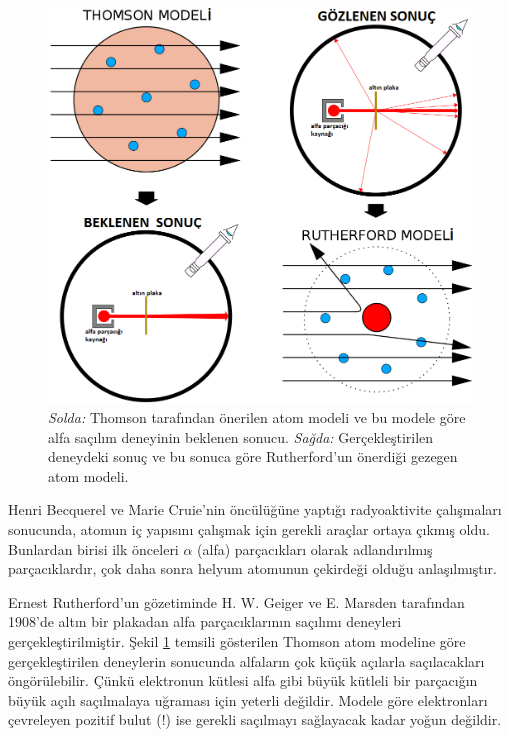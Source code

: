 \documentclass[a4paper,12pt, twoside]{article}
\begin{document}
\begin{figure}[hbtp]
\center
\includegraphics[scale=.5]{Thomson_vs_Rutherford_Atom.png}
\caption{ {\it Solda:} Thomson tarafından önerilen atom modeli ve bu modele göre alfa saçılım deneyinin beklenen sonucu. {\it Sağda:} Gerçekleştirilen deneydeki sonuç ve bu sonuca göre Rutherford'un önerdiği gezegen atom modeli. }
\label{fig:rutherfod_bohr_atom}
\end{figure}

Henri Becquerel ve Marie Cruie'nin öncülüğüne yaptığı radyoaktivite çalışmaları sonucunda, atomun iç yapısını çalışmak için gerekli araçlar ortaya çıkmış oldu. Bunlardan birisi ilk önceleri $\alpha$ (alfa) parçacıkları olarak adlandırılmış parçacıklardır, çok daha sonra helyum atomunun çekirdeği olduğu anlaşılmıştır. 

Ernest Rutherford'un gözetiminde H. W. Geiger  ve E. Marsden tarafından 1908'de altın bir plakadan alfa parçacıklarının saçılımı deneyleri gerçekleştirilmiştir. Şekil \ref{fig:rutherfod_bohr_atom} temsili gösterilen Thomson atom modeline göre gerçekleştirilen deneylerin sonucunda alfaların çok küçük açılarla saçılacakları öngörülebilir. Çünkü elektronun kütlesi alfa gibi büyük kütleli bir parçacığın büyük açılı saçılmalaya uğraması için yeterli değildir. Modele göre elektronları çevreleyen pozitif bulut (!) ise gerekli saçılmayı sağlayacak kadar yoğun değildir.
\end{document}
